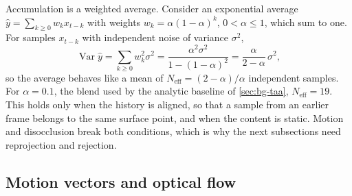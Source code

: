 Accumulation is a weighted average. Consider an exponential average $\hat y=\sum_{k\ge0}w_kx_{t-k}$ with weights $w_k=\alpha(1-\alpha)^k$, $0<\alpha\le1$, which sum to one. For samples $x_{t-k}$ with independent noise of variance $\sigma^2$,
\begin{equation}
\operatorname{Var}\hat y=\sum_{k\ge0}w_k^2\sigma^2=\frac{\alpha^2\sigma^2}{1-(1-\alpha)^2}=\frac{\alpha}{2-\alpha}\,\sigma^2,
\end{equation}
so the average behaves like a mean of $N_{\text{eff}}=(2-\alpha)/\alpha$ independent samples. For $\alpha=0.1$, the blend used by the analytic baseline of \cref{sec:bg-taa}, $N_{\text{eff}}=19$. This holds only when the history is aligned, so that a sample from an earlier frame belongs to the same surface point, and when the content is static. Motion and disocclusion break both conditions, which is why the next subsections need reprojection and rejection.

\subsection{Motion vectors and optical flow}\label{sec:bg-motion}

